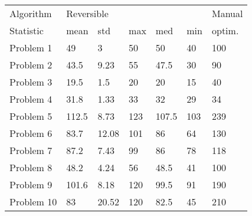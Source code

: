 \begin{tabular}{lllllll}
\toprule
Algorithm & \multicolumn{5}{l}{Reversible} & Manual \\
Statistic &       mean &    std &  max &    med &  min & optim. \\
\midrule
Problem 1  &         49 &      3 &   50 &     50 &   40 &    100 \\
Problem 2  &       43.5 &   9.23 &   55 &   47.5 &   30 &     90 \\
Problem 3  &       19.5 &    1.5 &   20 &     20 &   15 &     40 \\
Problem 4  &       31.8 &   1.33 &   33 &     32 &   29 &     34 \\
Problem 5  &      112.5 &   8.73 &  123 &  107.5 &  103 &    239 \\
Problem 6  &       83.7 &  12.08 &  101 &     86 &   64 &    130 \\
Problem 7  &       87.2 &   7.43 &   99 &     86 &   78 &    118 \\
Problem 8  &       48.2 &   4.24 &   56 &   48.5 &   41 &    100 \\
Problem 9  &      101.6 &   8.18 &  120 &   99.5 &   91 &    190 \\
Problem 10 &         83 &  20.52 &  120 &   82.5 &   45 &    210 \\
\bottomrule
\end{tabular}

